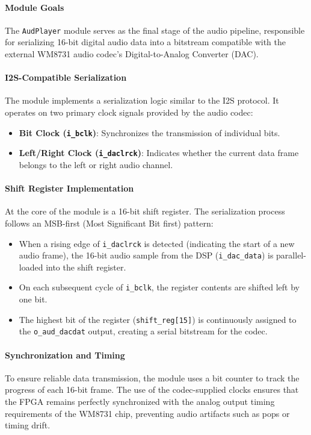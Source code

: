 \documentclass[12pt,a4paper]{article}
\begin{document}
\paragraph{Module Goals}
The \texttt{AudPlayer} module serves as the final stage of the audio pipeline, responsible for serializing 16-bit digital audio data into a bitstream compatible with the external WM8731 audio codec's Digital-to-Analog Converter (DAC).

\paragraph{I2S-Compatible Serialization}
The module implements a serialization logic similar to the I2S protocol. It operates on two primary clock signals provided by the audio codec:
\begin{itemize}
    \item \textbf{Bit Clock (\texttt{i\_bclk})}: Synchronizes the transmission of individual bits.
    \item \textbf{Left/Right Clock (\texttt{i\_daclrck})}: Indicates whether the current data frame belongs to the left or right audio channel.
\end{itemize}

\paragraph{Shift Register Implementation}
At the core of the module is a 16-bit shift register. The serialization process follows an MSB-first (Most Significant Bit first) pattern:
\begin{itemize}
    \item When a rising edge of \texttt{i\_daclrck} is detected (indicating the start of a new audio frame), the 16-bit audio sample from the DSP (\texttt{i\_dac\_data}) is parallel-loaded into the shift register.
    \item On each subsequent cycle of \texttt{i\_bclk}, the register contents are shifted left by one bit.
    \item The highest bit of the register (\texttt{shift\_reg[15]}) is continuously assigned to the \texttt{o\_aud\_dacdat} output, creating a serial bitstream for the codec.
\end{itemize}

\paragraph{Synchronization and Timing}
To ensure reliable data transmission, the module uses a bit counter to track the progress of each 16-bit frame. The use of the codec-supplied clocks ensures that the FPGA remains perfectly synchronized with the analog output timing requirements of the WM8731 chip, preventing audio artifacts such as pops or timing drift.
\end{document}
